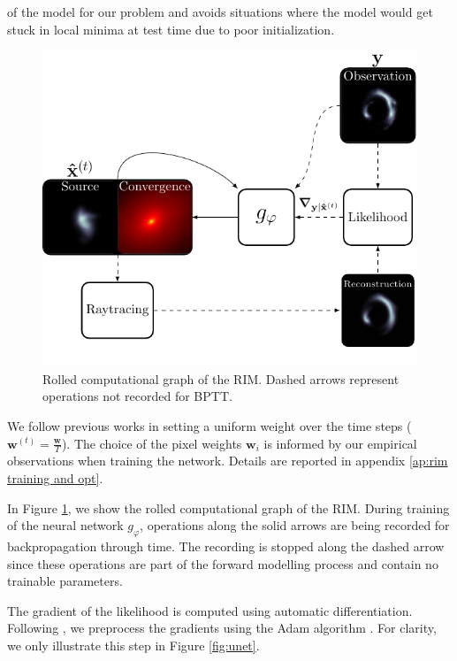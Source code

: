 of the model for our problem and avoids situations where 
the model would get stuck in local minima at 
test time due to poor initialization. 
\begin{figure}[t!]
        \centering
		\includegraphics[width=0.7\linewidth]{figures/schematic_rim}
        \caption{Rolled computational graph of the RIM. Dashed arrows represent operations not recorded for BPTT.}
        \label{fig:rolled graph}
\end{figure}


We follow previous works in setting a uniform weight over the time 
steps ($\mathbf{w}^{(t)} = \frac{\mathbf{w}}{T}$). 
The choice of the pixel weights $\mathbf{w}_i$ is informed
by our empirical observations when training the network. Details are reported in appendix \ref{ap:rim training and opt}.

In Figure \ref{fig:rolled graph}, we show the rolled computational graph of the 
RIM. During training of the neural network $g_\varphi$, operations along the solid arrows are being 
recorded for backpropagation through time. 
The recording is stopped along the dashed arrow since these operations 
are part of the forward modelling process and contain no trainable parameters.

The gradient of the likelihood is computed using automatic differentiation. Following 
\citep{Modi2021}, we preprocess the gradients using the Adam algorithm \citep{Kingma2014}. 
For clarity, we only illustrate this step in Figure \ref{fig:unet}. 

